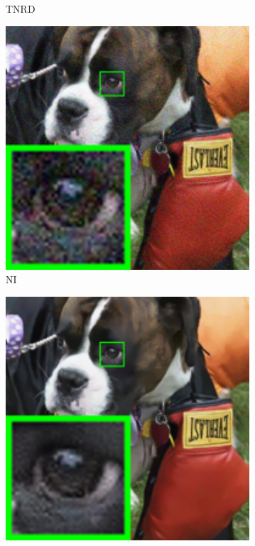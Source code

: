 \begin{figure}
\begin{subfigure}[t]{0.19\textwidth}
\caption{TNRD}
    \end{subfigure}
    \hfill
    \begin{subfigure}[t]{0.19\textwidth}
        \centering
        \includegraphics[width=1\textwidth]{images/mcwnnm/nc/resize_br_NI_dog.png}
\caption{NI}
    \end{subfigure}
\hfill
    \begin{subfigure}[t]{0.19\textwidth}
        \centering
        \includegraphics[width=1\textwidth]{images/mcwnnm/nc/resize_br_NC_dog.png}

\end{subfigure}
\end{figure}

